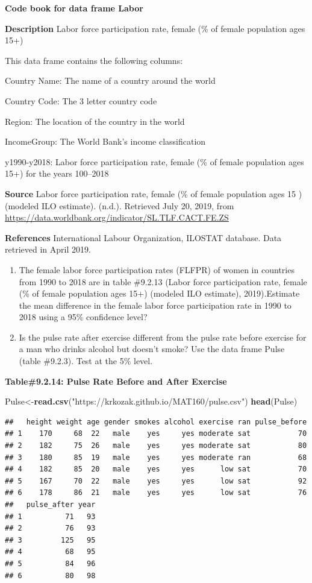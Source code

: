 \documentclass[]{book}
\newenvironment{Shaded}{\begin{snugshade}}{\end{snugshade}}
\newcommand{\KeywordTok}[1]{\textcolor[rgb]{0.13,0.29,0.53}{\textbf{#1}}}
\newcommand{\NormalTok}[1]{#1}
\newcommand{\StringTok}[1]{\textcolor[rgb]{0.31,0.60,0.02}{#1}}
\begin{document}
\textbf{Code book for data frame Labor}

\textbf{Description}
Labor force participation rate, female (\% of female population ages 15+)

This data frame contains the following columns:

Country Name: The name of a country around the world

Country Code: The 3 letter country code

Region: The location of the country in the world

IncomeGroup: The World Bank's income classification

y1990-y2018: Labor force participation rate, female (\% of female population ages 15+) for the years 100--2018

\textbf{Source}
Labor force participation rate, female (\% of female population ages 15 ) (modeled ILO estimate). (n.d.). Retrieved July 20, 2019, from \url{https://data.worldbank.org/indicator/SL.TLF.CACT.FE.ZS}

\textbf{References}
International Labour Organization, ILOSTAT database. Data retrieved in April 2019.

\begin{enumerate}
\def\labelenumi{\arabic{enumi}.}
\setcounter{enumi}{9}
\item
  The female labor force participation rates (FLFPR) of women in countries from 1990 to 2018 are in table \#9.2.13 (Labor force participation rate, female (\% of female population ages 15+) (modeled ILO estimate), 2019).Estimate the mean difference in the female labor force participation rate in 1990 to 2018 using a 95\% confidence level?
\item
  Is the pulse rate after exercise different from the pulse rate before exercise for a man who drinks alcohol but doesn't smoke? Use the data frame Pulse (table \#9.2.3). Test at the 5\% level.
\end{enumerate}

\textbf{Table\#9.2.14: Pulse Rate Before and After Exercise}

\begin{Shaded}
\begin{Highlighting}[]
\NormalTok{Pulse<-}\KeywordTok{read.csv}\NormalTok{(}\StringTok{"https://krkozak.github.io/MAT160/pulse.csv"}\NormalTok{)}
\KeywordTok{head}\NormalTok{(Pulse)}
\end{Highlighting}
\end{Shaded}

\begin{verbatim}
##   height weight age gender smokes alcohol exercise ran pulse_before
## 1    170     68  22   male    yes     yes moderate sat           70
## 2    182     75  26   male    yes     yes moderate sat           80
## 3    180     85  19   male    yes     yes moderate ran           68
## 4    182     85  20   male    yes     yes      low sat           70
## 5    167     70  22   male    yes     yes      low sat           92
## 6    178     86  21   male    yes     yes      low sat           76
##   pulse_after year
## 1          71   93
## 2          76   93
## 3         125   95
## 4          68   95
## 5          84   96
## 6          80   98
\end{verbatim}
\end{document}
